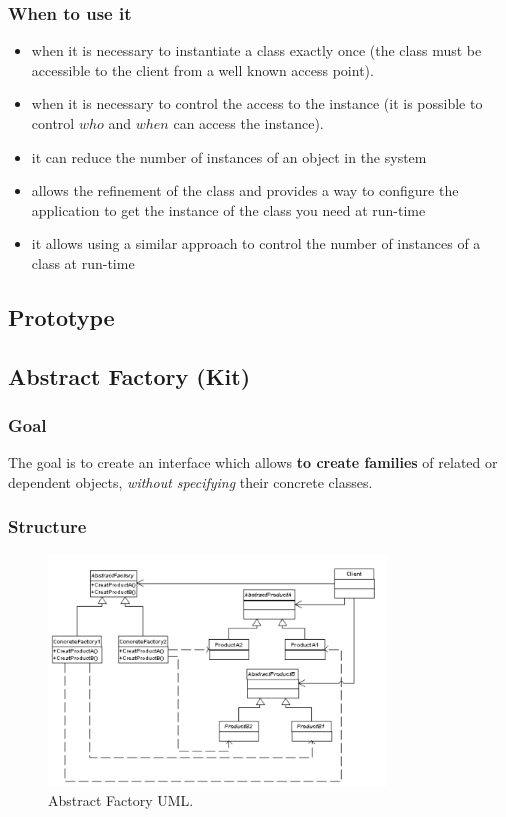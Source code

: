 \documentclass{article}
\begin{document}
\subsubsection{When to use it}
\begin{itemize}
\item when it is necessary to instantiate  a class exactly once (the class must be accessible to the client from a well known access point).
\item when it is necessary to control the access to the instance (it is possible to control $who$ and $when$ can access the instance).
\item it can reduce the number of instances of an object in the system
\item allows the refinement of the class and provides a way to configure the application to get the instance of the class you need at run-time
\item it allows using a similar approach to control the number of instances of a class at run-time
\end{itemize}

\subsection{Prototype}

\subsection{Abstract Factory (Kit)}
\subsubsection{Goal}
The goal is to create an interface which allows \textbf{to create families} of related or dependent objects, \textit{without specifying} their concrete classes. 

\subsubsection{Structure}

\begin{figure}[h!]
  \centering
    \includegraphics[width=0.8\textwidth]{Img/AbstractFactoryUML.png}
     \caption{Abstract Factory UML.}
     \label{AbstractFactoryUML}
\end{figure}
\end{document}
